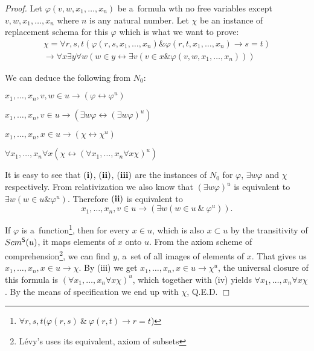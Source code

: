 \documentclass[12pt,a4paper]{article}
\newenvironment{proof}
{\noindent \textit{Proof.}}
{\hspace*{\fill} $\Box$}
\renewcommand{\iff}{\leftrightarrow}
\newcommand{\then}{\rightarrow}
\newcommand{\bce}{\begin{compactenum}}
\newcommand{\ece}{\end{compactenum}}
\begin{document}
\begin{proof}
Let $\varphi(v, w, x_1, \ldots, x_n)$ be a~formula wth no free variables except $v, w, x_1, \ldots, x_n$ where $n$ is any natural number.
Let $\chi$ be an instance of replacement schema for this $\varphi$ which is what we want to prove:
\begin{equation}
\begin{gathered}
\chi = \forall r, s, t(\varphi(r, s, x_1, \ldots, x_n) \& \varphi(r, t, x_1, \ldots, x_n) \then s = t) \\
\then \forall x \exists y \forall w (w \in y \iff \exists v (v \in x \& \varphi(v, w, x_1, \ldots, x_n)))
\end{gathered}
\end{equation}

We can deduce the following from $N_0$: 
\bce[(i)]
\item $x_1, \ldots, x_n, v, w \in u \then (\varphi \iff \varphi^{u}) $
\item $x_1, \ldots, x_n, v \in u \then (\exists w \varphi \iff (\exists w \varphi)^{u})$
\item $x_1, \ldots, x_n, x \in u \then (\chi \iff \chi^{u})$
\item $\forall x_1, \ldots, x_n \forall x (\chi \iff (\forall x_1, \ldots, x_n \forall x \chi)^{u})$
\ece

It is easy to see that $\bold{(i)}$, $\bold{(ii)}$, $\bold{(iii)}$ are the instances of $N_0$ for $\varphi$, $\exists w \varphi$ and $\chi$ respectively.  
From relativization we also know that $(\exists w \varphi)^{u}$ is equivalent to $\exists w (w \in u \& \varphi^{u})$.
Therefore $\bold{(ii)}$ is equivalent to
\begin{equation}
x_1, \ldots, x_n, v \in u \then (\exists w (w \in u\ \&\ \varphi^{u})). 
\end{equation}

If $\varphi$ is a~function\footnote{$ \forall r, s, t(\varphi(r, s)\ \&\ \varphi(r, t) \then r=t $)}, then for every $x \in u$, which is also $x \subset u$ by the transitivity of $Scm^{\sf{S}}(u)$,
it maps elements of $x$ onto $u$. From the axiom scheme of comprehension\footnote{Lévy's uses its equivalent, axiom of subsets}, we can find $y$, a~set of all images of elements of $x$.
That gives us $x_1, \ldots, x_n, x \in u \then \chi$. By (iii) we get $x_1, \ldots, x_n, x \in u \then \chi^{u}$, the universal closure of this formula is $(\forall x_1, \ldots, x_n \forall x \chi)^{u}$, 
which together with (iv) yields $\forall x_1, \ldots, x_n \forall x \chi$. By the means of specification we end up with $\chi$, Q.E.D. 
\end{proof}
\end{document}
